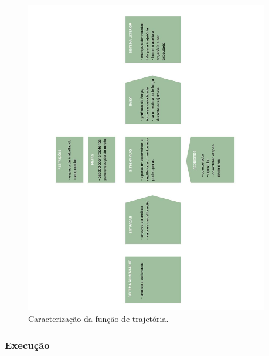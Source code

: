 \documentclass[12pt,a4paper]{article}
\begin{document}
\begin{figure}[H]
\begin{center}
  \includegraphics[width=0.95\textwidth]{figs/caracterizacao_trajetoria.jpg}
  \caption{Caracterização da função de trajetória.}
  \label{fig:caracterizacao_trajetoria}
\end{center}
\end{figure} 

\subsubsection {Execução}
\end{document}
